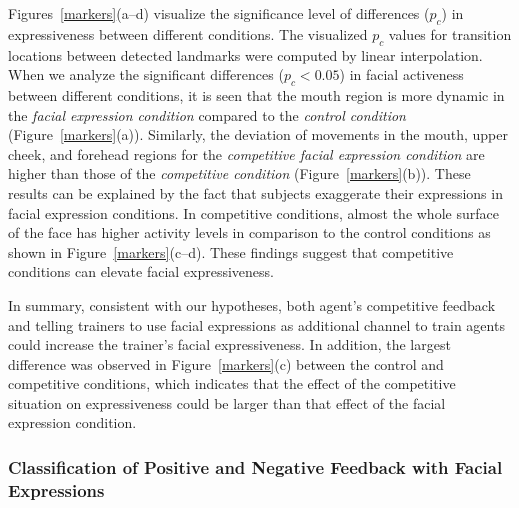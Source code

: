 \documentclass[10pt,journal,compsoc]{IEEEtran}
\begin{document}
Figures~\ref{markers}(a--d) visualize the significance level of
differences ($p_c$) in expressiveness between different
conditions. The visualized $p_c$ values for transition
locations between detected landmarks were computed by linear
interpolation. When we analyze the significant differences
($p_c<0.05$) in facial activeness between different conditions,
it is seen that the mouth region is more dynamic in the \emph{facial
expression condition} compared to the \emph{control condition}
(Figure~\ref{markers}(a)). Similarly, the deviation of movements in the 
mouth, upper cheek, and forehead regions for the \emph{competitive
facial expression condition} are higher than those of the
\emph{competitive condition} (Figure~\ref{markers}(b)). These
results can be explained by the fact that subjects exaggerate
their expressions in facial expression conditions. In
competitive conditions, almost the whole surface of the face has
higher activity levels in comparison to the control conditions as
shown in Figure~\ref{markers}(c--d). These findings suggest
that competitive conditions can elevate facial expressiveness. 

In summary, consistent with our hypotheses, both agent's competitive feedback and telling trainers to use facial expressions as additional channel to train agents could increase the trainer's facial expressiveness. In addition, the largest difference was observed in Figure~\ref{markers}(c) between the control and competitive conditions, which indicates that the effect of the competitive situation on expressiveness could be larger than that effect of the facial expression condition. %

\subsubsection{Classification of Positive and Negative Feedback with Facial Expressions}
\label{sec:classify}
\end{document}
